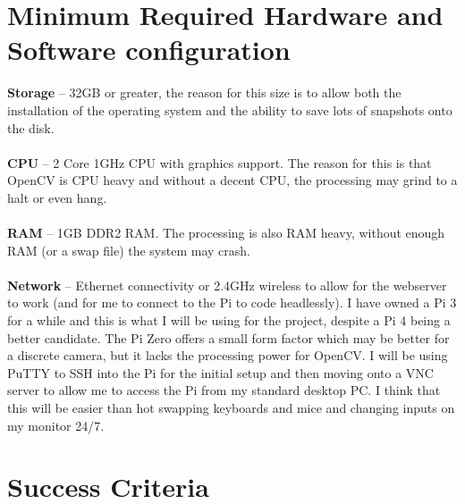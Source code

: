 \documentclass[9pt]{article}
\begin{document}
\section{Minimum Required Hardware and Software configuration}\label{sec_hardware}
\textbf{Storage} -- 32GB or greater, the reason for this size is to allow both the installation of the operating system and the ability to save lots of snapshots onto the disk.\\\\
\textbf{CPU} -- 2 Core 1GHz CPU with graphics support. The reason for this is that OpenCV is CPU heavy and without a decent CPU, the processing may grind to a halt or even hang.\\\\
\textbf{RAM} -- 1GB DDR2 RAM. The processing is also RAM heavy, without enough RAM (or a swap file) the system may crash. \\\\
\textbf{Network} -- Ethernet connectivity or 2.4GHz wireless to allow for the webserver to work (and for me to connect to the Pi to code headlessly).
I have owned a Pi 3 for a while and this is what I will be using for the project, despite a Pi 4 being a better candidate. The Pi Zero offers a small form factor which may be better for a discrete camera, but it lacks the processing power for OpenCV. I will be using PuTTY to SSH into the Pi for the initial setup and then moving onto a VNC server to allow me to access the Pi from my standard desktop PC. I think that this will be easier than hot swapping keyboards and mice and changing inputs on my monitor 24/7. 
\newpage
\section{Success Criteria}\label{sec_succes}
\end{document}

